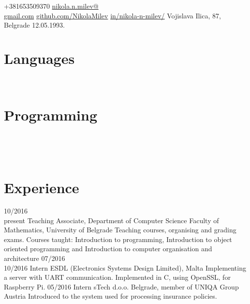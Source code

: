 \documentclass{my_cv}
\begin{document}
	{+381653509370}
 	{\href{mailto:nikola.n.milev@gmail.com}{nikola.n.milev@\\gmail.com}}
	{ \href{https://github.com/NikolaMilev}{github.com/NikolaMilev}} 	
 	{ \href{https://www.linkedin.com/in/nikola-n-milev/}{in/nikola-n-milev/}}
	{ Vojislava Ilica, 87, Belgrade }
	{12.05.1993.}


 
\begin{aside}
\section{Languages}
\bodyfont{}
~
~
\section{Programming}
~
\end {aside}
~
\section{Experience}
\begin{entrylist}
\entry
    {10/2016~\textemdash \\present}
    {Teaching Associate, Department of Computer Science}
    {Faculty of Mathematics, University of Belgrade}
    {Teaching courses, organising and grading exams. Courses taught: Introduction to programming, Introduction to object oriented programming and Introduction to computer organisation and architecture}
\entry
    {07/2016~\textemdash \\10/2016}
    {Intern}
    {ESDL (Electronics Systems Design Limited), Malta}
    {Implementing a server with UART communication. Implemented in C, using OpenSSL, for Raspberry Pi.}
\entry
    {05/2016}
    {Intern}
    {sTech d.o.o. Belgrade, member of UNIQA Group Austria}
    {Introduced to the system used for processing insurance policies.}
\end{entrylist}
\end{document}
